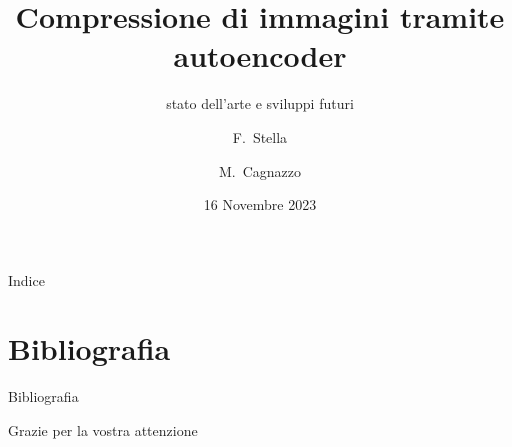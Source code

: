 \documentclass{beamer}
\title{Compressione di immagini tramite autoencoder}
\subtitle{stato dell’arte e sviluppi futuri}
\author[Filippo Stella, Marco Cagnazzo]{F.~Stella \and M.~Cagnazzo}
\date{16 Novembre 2023}
\begin{document}
\frame{\titlepage}

\begin{frame}{Indice}
    \tableofcontents    
\end{frame}


    




\section{Bibliografia}
    
\begin{frame}[allowframebreaks]{Bibliografia}
    \tiny\printbibliography
\end{frame}
    
\begin{frame}{\:}
    \begin{center}
        \large Grazie per la vostra attenzione 
    \end{center}
\end{frame}
    
\end{document}
